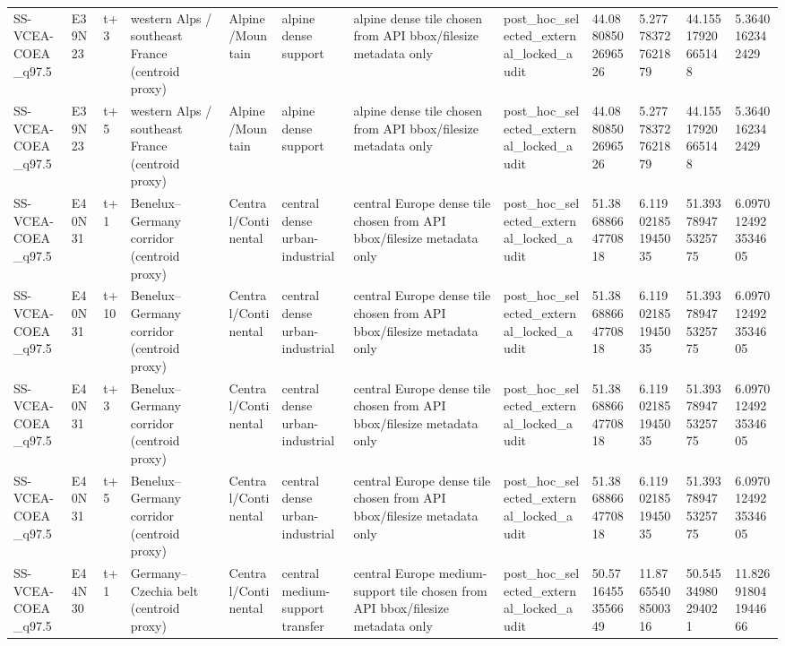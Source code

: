 \begin{landscape}
\begin{longtable}{llllllllllll}
SS-VCEA-COEA\_q97.5 & E39N23 & t+3 & western Alps / southeast France (centroid proxy) & Alpine/Mountain & alpine dense support & alpine dense tile chosen from API bbox/filesize metadata only & post\_hoc\_selected\_external\_locked\_audit & 44.08808502696526 & 5.277783727621879 & 44.15517920665148 & 5.3640162342429 \\
SS-VCEA-COEA\_q97.5 & E39N23 & t+5 & western Alps / southeast France (centroid proxy) & Alpine/Mountain & alpine dense support & alpine dense tile chosen from API bbox/filesize metadata only & post\_hoc\_selected\_external\_locked\_audit & 44.08808502696526 & 5.277783727621879 & 44.15517920665148 & 5.3640162342429 \\
SS-VCEA-COEA\_q97.5 & E40N31 & t+1 & Benelux–Germany corridor (centroid proxy) & Central/Continental & central dense urban-industrial & central Europe dense tile chosen from API bbox/filesize metadata only & post\_hoc\_selected\_external\_locked\_audit & 51.38688664770818 & 6.119021851945035 & 51.393789475325775 & 6.0970124923534605 \\
SS-VCEA-COEA\_q97.5 & E40N31 & t+10 & Benelux–Germany corridor (centroid proxy) & Central/Continental & central dense urban-industrial & central Europe dense tile chosen from API bbox/filesize metadata only & post\_hoc\_selected\_external\_locked\_audit & 51.38688664770818 & 6.119021851945035 & 51.393789475325775 & 6.0970124923534605 \\
SS-VCEA-COEA\_q97.5 & E40N31 & t+3 & Benelux–Germany corridor (centroid proxy) & Central/Continental & central dense urban-industrial & central Europe dense tile chosen from API bbox/filesize metadata only & post\_hoc\_selected\_external\_locked\_audit & 51.38688664770818 & 6.119021851945035 & 51.393789475325775 & 6.0970124923534605 \\
SS-VCEA-COEA\_q97.5 & E40N31 & t+5 & Benelux–Germany corridor (centroid proxy) & Central/Continental & central dense urban-industrial & central Europe dense tile chosen from API bbox/filesize metadata only & post\_hoc\_selected\_external\_locked\_audit & 51.38688664770818 & 6.119021851945035 & 51.393789475325775 & 6.0970124923534605 \\
SS-VCEA-COEA\_q97.5 & E44N30 & t+1 & Germany–Czechia belt (centroid proxy) & Central/Continental & central medium-support transfer & central Europe medium-support tile chosen from API bbox/filesize metadata only & post\_hoc\_selected\_external\_locked\_audit & 50.57164553556649 & 11.87655408500316 & 50.54534980294021 & 11.826918041944666 \\

\end{longtable}
\end{landscape}

